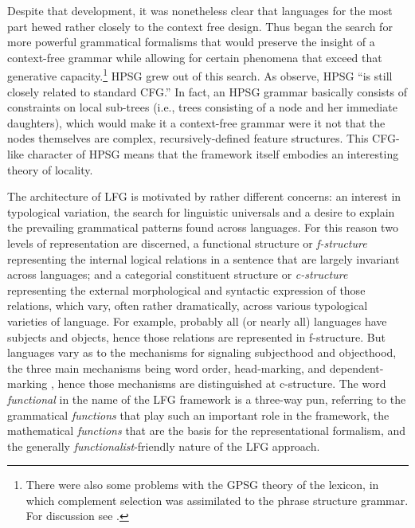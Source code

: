 Despite that development, it was nonetheless clear that languages for the most part hewed rather closely to the context free design.  Thus began the search for more powerful grammatical formalisms that would preserve the insight of a context-free grammar while allowing for certain phenomena that exceed that generative capacity.\footnote{There were also some problems with the GPSG theory of the lexicon, in which complement selection was assimilated to the phrase structure grammar.  For discussion see \citet{MWArgSt}.}  HPSG grew out of this search. As  \citet[83]{SWB2003a} observe, HPSG ``is still  closely related to standard CFG.''  In fact, an HPSG grammar basically consists of constraints on local sub-trees (i.e., trees consisting of a node and her immediate daughters), which would make it a context-free grammar were it not that the nodes themselves are complex, recursively-defined feature structures.   This CFG-like character of HPSG means that the framework itself embodies an interesting theory of locality.    

The architecture of LFG is motivated by rather different concerns:  an interest in typological variation, the search for linguistic universals and a desire to explain the prevailing grammatical patterns found across languages.  For this reason two levels of representation are discerned, a functional structure or \textit{f-structure} representing the internal logical relations in a sentence that are largely invariant across languages; and a categorial constituent structure or \textit{c-structure} representing the external morphological and syntactic expression of those relations, which vary, often rather dramatically, across various typological varieties of language.  For example, probably all (or nearly all) languages have subjects and objects, hence those relations are represented in f-structure.  But languages vary as to the mechanisms for signaling subjecthood and objecthood,  the three main mechanisms being word order, head-marking, and dependent-marking \citep{Nichols86a-u}, hence those mechanisms are distinguished at c-structure.    The word \textit{functional} in the name of the LFG framework  is a three-way pun, referring to the grammatical \textit{functions} that play such an important role in the framework, the mathematical \textit{functions} that are the basis for the representational formalism, and the generally \textit{functionalist}-friendly nature of the LFG approach.  

